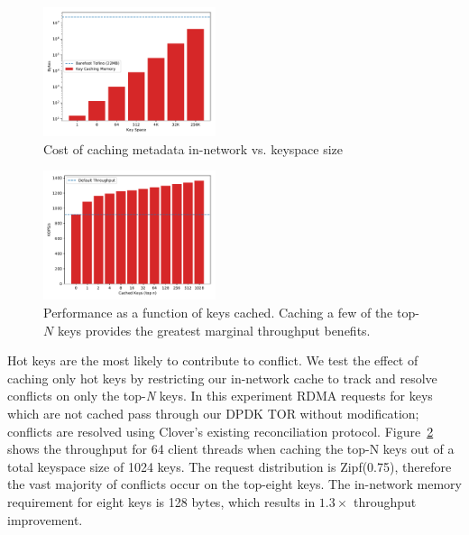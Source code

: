 \begin{figure}
    \includegraphics[width=0.45\textwidth]{fig/memory.pdf}
    \caption{Cost of caching metadata in-network vs. keyspace size}
    \label{fig:memory}
\end{figure}
\begin{figure}
    \includegraphics[width=0.45\textwidth]{fig/cache.pdf}
    \caption{Performance as a function of keys cached. Caching a few
    of the top-$N$ keys provides the greatest marginal throughput
    benefits.}
    \label{fig:cache}
\end{figure}

Hot keys are the most likely to
contribute to conflict.
We test the effect of
caching only hot keys by restricting our in-network cache to track and
resolve conflicts on only the top-\textit{N} keys. In this experiment
RDMA requests for keys which are not cached pass through our DPDK TOR
without modification; conflicts are resolved using Clover's existing
reconciliation protocol. Figure~\ref{fig:cache} shows
the throughput for 64 client threads when caching the top-N keys out of a total keyspace size of 1024 keys. The request
distribution is Zipf(0.75), therefore the vast majority of conflicts
occur on the top-eight keys. The in-network memory requirement for eight keys
is 128 bytes, which results in $1.3\times$ throughput improvement.



